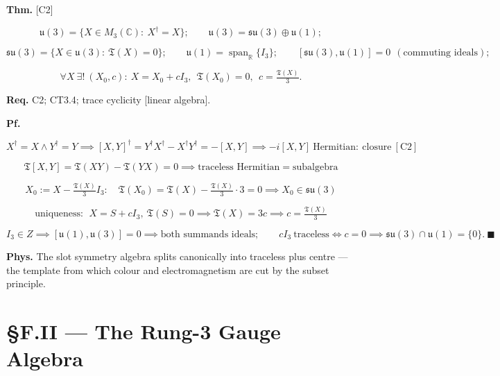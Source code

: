 \begin{theorem}\label{tag:CT3-5}
\textbf{Thm.} [C2]

\[
\mathfrak u(3)=\{X\in M_3(\mathbb C):\ X^\dagger=X\};\qquad
\mathfrak u(3)=\mathfrak{su}(3)\oplus\mathfrak u(1);
\]

\[
\mathfrak{su}(3)=\{X\in\mathfrak u(3):\ \mathfrak T(X)=0\};\qquad
\mathfrak u(1)=\operatorname{span}_{\mathbb R}\{I_3\};\qquad
[\mathfrak{su}(3),\mathfrak u(1)]=0\ \ (\text{commuting ideals});
\]

\[
\forall X\ \exists!\ (X_0,c):\ X=X_0+cI_3,\ \ \mathfrak T(X_0)=0,\ \ c=\tfrac{\mathfrak T(X)}{3}.
\]

\textbf{Req.} C2; CT3.4; trace cyclicity [linear algebra].

\textbf{Pf.}

\[
X^\dagger=X\wedge Y^\dagger=Y\implies[X,Y]^\dagger=Y^\dagger X^\dagger-X^\dagger Y^\dagger=-[X,Y]\implies-i[X,Y]\ \text{Hermitian}:\ \text{closure}\ [\mathrm{C2}]
\]

\[
\mathfrak T[X,Y]=\mathfrak T(XY)-\mathfrak T(YX)=0\implies\text{traceless Hermitian}=\text{subalgebra}
\]

\[
X_0:=X-\tfrac{\mathfrak T(X)}{3}I_3:\quad\mathfrak T(X_0)=\mathfrak T(X)-\tfrac{\mathfrak T(X)}{3}\cdot3=0\implies X_0\in\mathfrak{su}(3)
\]

\[
\text{uniqueness}:\ \ X=S+cI_3,\ \mathfrak T(S)=0\implies\mathfrak T(X)=3c\implies c=\tfrac{\mathfrak T(X)}3
\]

\[
I_3\in Z\implies[\mathfrak u(1),\mathfrak u(3)]=0\implies\text{both summands ideals};\qquad
cI_3\ \text{traceless}\iff c=0\implies\mathfrak{su}(3)\cap\mathfrak u(1)=\{0\}.\ \blacksquare
\]

\textbf{Phys.} The slot symmetry algebra splits canonically into traceless plus centre — the template from which colour and electromagnetism are cut by the subset principle.

\end{theorem}

\section[§F.II — The Rung-3 Gauge Algebra]{\texorpdfstring{§F.II — The Rung-3 Gauge Algebra}{SF.II - The Rung-3 Gauge Algebra}}

